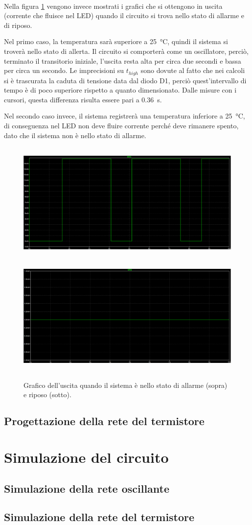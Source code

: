\documentclass{report}
\begin{document}
\\Nella figura \ref{figura:555out} vengono invece mostrati i grafici che si ottengono in uscita (corrente che fluisce nel LED) quando il circuito si trova nello stato di allarme e di riposo. \par
Nel primo caso, la temperatura sarà superiore a \SI{25}{\degree}C, quindi il sistema si troverà nello stato di allerta. Il circuito si comporterà come un oscillatore, perciò, terminato il transitorio iniziale, l'uscita resta alta per circa due secondi e bassa per circa un secondo. Le imprecisioni su $t_{high}$ sono dovute al fatto che nei calcoli si è trascurata la caduta di tensione data dal diodo D1, perciò quest'intervallo di tempo è di poco superiore rispetto a quanto dimensionato. Dalle misure con i cursori, questa differenza risulta essere pari a \SI{0.36}{\second}. \par
Nel secondo caso invece, il sistema registrerà una temperatura inferiore a \SI{25}{\degree}C, di conseguenza nel LED non deve fluire corrente perché deve rimanere spento, dato che il sistema non è nello stato di allarme.
\begin{figure}[h!]
	\centering
	\includegraphics[height=6cm]{immagini/555on}
	\includegraphics[height=6cm]{immagini/555off}
	\caption{Grafico dell'uscita quando il sistema è nello stato di allarme (sopra) e riposo (sotto).} 
	\label{figura:555out}
\end{figure}
\subsection{Progettazione della rete del termistore}\label{rete_termistore}

\newpage
\section{Simulazione del circuito}
\subsection{Simulazione della rete oscillante}
\subsection{Simulazione della rete del termistore}
\end{document}
